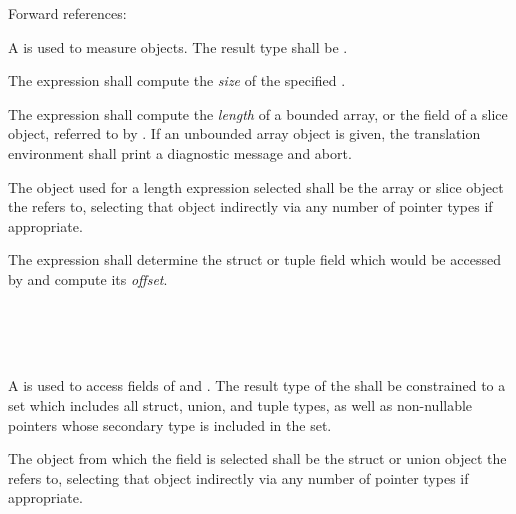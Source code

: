 Forward references: 

\specsubsubitem
A  is used to measure objects. The result
type shall be .

\specsubsubitem
The  expression shall compute the \textit{size} of the specified
.

\specsubsubitem
The  expression shall compute the \textit{length} of a bounded
array, or the  field of a slice object, referred to by
. If an unbounded array object is given, the translation
environment shall print a diagnostic message and abort.

\specsubsubitem
The object used for a length expression selected shall be the array or slice
object the  refers to, selecting that object indirectly
via any number of pointer types if appropriate.

\specsubsubitem
The  expression shall determine the struct or tuple field
which would be accessed by  and compute
its \textit{offset}.


\begin{grammar}
 \\
	   \\
	   \\
\end{grammar}

\specsubsubitem
A  is used to access fields of
 and . The result type
of the  shall be constrained to a set which
includes all struct, union, and tuple types, as well as non-nullable pointers
whose secondary type is included in the set.


\specsubsubitem
The object from which the field is selected shall be the struct or union object
the  refers to, selecting that object indirectly
via any number of pointer types if appropriate.

